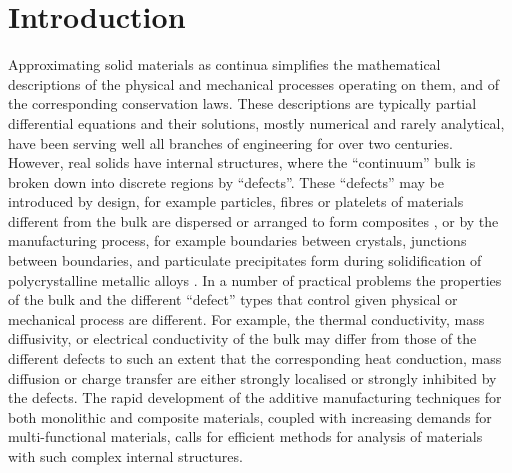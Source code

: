 \documentclass{elsarticle}
\theoremstyle{definition}
\begin{document}
\section{Introduction}
Approximating solid materials as continua simplifies the mathematical descriptions of the physical and mechanical processes operating on them, and of the corresponding conservation laws. These descriptions are typically partial differential equations and their solutions, mostly numerical and rarely analytical, have been serving well all branches of engineering for over two centuries. However, real solids have internal structures, where the ``continuum'' bulk is broken down into discrete regions by ``defects''. These ``defects'' may be introduced by design, for example particles, fibres or platelets of materials different from the bulk are dispersed or arranged to form composites \cite{Boisse2021_Composites}, or by the manufacturing process, for example boundaries between crystals, junctions between boundaries, and particulate precipitates form during solidification of polycrystalline metallic alloys \cite{Sankaran2017_Alloys}. In a number of practical problems the properties of the bulk and the different ``defect'' types that control given physical or mechanical process are different. For example, the thermal conductivity, mass diffusivity, or electrical conductivity of the bulk may differ from those of the different defects to such an extent that the corresponding heat conduction, mass diffusion or charge transfer are either strongly localised or strongly inhibited by the defects. The rapid development of the additive manufacturing techniques for both monolithic \cite{DebRoy2018_AMmetals} and composite \cite{Ngo2018_AMcomposites} materials, coupled with increasing demands for multi-functional materials, calls for efficient methods for analysis of materials with such complex internal structures.
\end{document}
